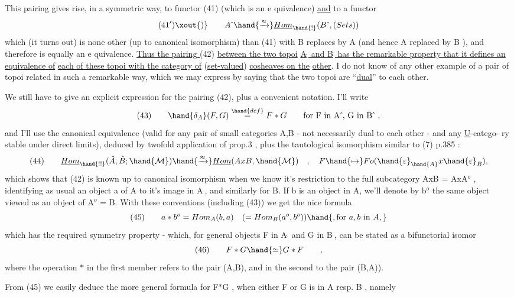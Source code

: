 
This pairing gives rise, in a symmetric way,  to  functor (41) (which is
an e quivalence)  \uline{and} to a functor
\[ (41')\xout{)} \qquad A\hat{\ } \hand{\xrightarrow{\approx}} \underline{Hom}_{\hand{!}}(B\hat{\ }, (Sets)) \]
which (it turns out) is none  other (up to canonical isomorphism) than
(41) with B replaces by A (and hence A replaced by B ),  and therefore is
equally an e quivalence.  \uline{Thus the pairing }(42)  \uline{between the two topoi}
\uline{A$\hat{\ }$ and B$\hat{\ }$ has the remarkable property that it defines an equivalence of}
\uline{each of these topoi with the category of} (\uline{set-valued}) \uline{cosheaves on the}
\uline{other}.  I do not know of any other example of a pair of topoi related
in such a remarkable way,  which we may express by saying that the two
topoi are ``\uline{dual}'' to each other.

We still have to give an explicit expression for the pairing (42),
plus a convenient notation.  I'll write
\[ (43) \qquad \hand{\delta_A}(F,G) \overset{\hand{def}}{=} F \ast G \qquad \text{for  F in A$\hat{\ }$, G in B$\hat{\ }$ } , \]
and I'll use the canonical equivalence (valid for any pair of small
categories A,B  - not necessarily dual to each other -  and any \uline{U}-catego-%
ry  stable under direct limits),  deduced by twofold application of
prop.3 ,  plus the tautological isomorphism similar to (7) p.385  :
\[ (44) \qquad \underline{Hom}_{\hand{!!}}(\hat{A},\hat{B}; \hand{\mathcal{M}}) \hand{\xrightarrow{\approx}} \underline{Hom}(AxB, \hand{\mathcal{M}}) \quad , \quad F \hand{\mapsto} Fo(\hand{\varepsilon}_{\hand{A}} x \hand{\varepsilon}_B) , \]
which shows that (42) is known up to canonical isomorphism  when we know
it's restriction to the full subcategory AxB = AxA$^{o}$ ,  identifying as
usual an object a of A to it's image in A$\hat{\ }$, and similarly for B.  If
b is an object in A,  we'll denote by b$^{o}$  the same object viewed as an
object of A$^{o}$ = B.  With these conventions (including (43)) we get the
nice formula
\[ (45) \qquad a \ast b^{o} = Hom_A(b,a) \quad ( = Hom_B(a^{o},b^{o}) ) \hand{, \text{for } a,b \text{ in } A,} \]
which has the required symmetry property  -  which,  for general
objects  F in A$\hat{\ }$ and G in B$\hat{\ }$,  can be stated as  a bifunctorial isomor
\[ (46) \qquad F \ast G \hand{\simeq} G \ast F \qquad , \]
where the operation $\ast$  in the first member refers to the pair (A,B),  and
in the second to the pair  (B,A)).

From (45)  we easily deduce the more general formula for F$\ast$G , when
either F or G is in A resp. B ,  namely

